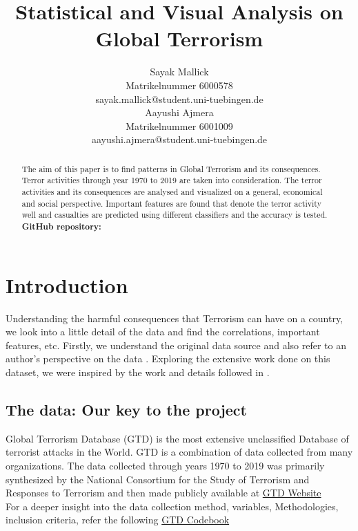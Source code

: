 \documentclass{article}
\title{Statistical and Visual Analysis on Global Terrorism}
\author{%
Sayak Mallick \\
Matrikelnummer 6000578 \\
sayak.mallick@student.uni-tuebingen.de \\
\And
Aayushi Ajmera \\
Matrikelnummer 6001009 \\
aayushi.ajmera@student.uni-tuebingen.de \\
}
\begin{document}
\maketitle

\begin{abstract}
The aim of this paper is to find patterns in Global Terrorism and its consequences. Terror activities through year 1970 to 2019 are taken into consideration. The terror activities and its consequences are analysed and visualized on a general, economical and social perspective. Important features are found that denote the terror activity well and casualties are predicted using different classifiers and the accuracy is tested. 
\textbf{GitHub repository:} \url{}
\end{abstract}

\section{Introduction}
Understanding the harmful consequences that Terrorism can have on a country, we look into a little detail of the data and find the correlations, important features, etc.
Firstly, we understand the original data source and also refer to an author's perspective on the data \cite{gtd}. Exploring the extensive work done on this dataset, we were inspired by the work and details followed in \cite{terror2021}.
\subsection{The data: Our key to the project}
Global Terrorism Database (GTD) is the most extensive unclassified Database of terrorist attacks in the World. GTD is a combination of data collected from many organizations. The data collected through years 1970 to 2019 was primarily synthesized by the National Consortium for the Study of Terrorism and Responses to Terrorism and then made publicly available at \href{https://www.start.umd.edu/gtd/}{GTD Website}
\\For a deeper insight into the data collection method, variables, Methodologies, inclusion criteria, refer the following \href{https://www.start.umd.edu/gtd/downloads/Codebook.pdf}{GTD Codebook}
\end{document}

